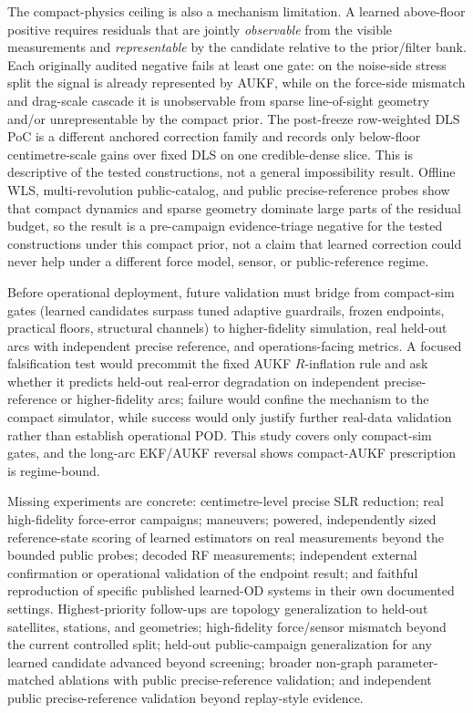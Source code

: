 \documentclass{article}
\begin{document}
The compact-physics ceiling is also a mechanism limitation. A learned above-floor positive requires residuals that are jointly \emph{observable} from the visible measurements and \emph{representable} by the candidate relative to the prior/filter bank. Each originally audited negative fails at least one gate: on the noise-side stress split the signal is already represented by AUKF, while on the force-side mismatch and drag-scale cascade it is unobservable from sparse line-of-sight geometry and/or unrepresentable by the compact prior. The post-freeze row-weighted DLS PoC is a different anchored correction family and records only below-floor centimetre-scale gains over fixed DLS on one credible-dense slice. This is descriptive of the tested constructions, not a general impossibility result. Offline WLS, multi-revolution public-catalog, and public precise-reference probes show that compact dynamics and sparse geometry dominate large parts of the residual budget, so the result is a pre-campaign evidence-triage negative for the tested constructions under this compact prior, not a claim that learned correction could never help under a different force model, sensor, or public-reference regime.

Before operational deployment, future validation must bridge from compact-sim gates (learned candidates surpass tuned adaptive guardrails, frozen endpoints, practical floors, structural channels) to higher-fidelity simulation, real held-out arcs with independent precise reference, and operations-facing metrics. A focused falsification test would precommit the fixed AUKF \(R\)-inflation rule and ask whether it predicts held-out real-error degradation on independent precise-reference or higher-fidelity arcs; failure would confine the mechanism to the compact simulator, while success would only justify further real-data validation rather than establish operational POD. This study covers only compact-sim gates, and the long-arc EKF/AUKF reversal shows compact-AUKF prescription is regime-bound.

Missing experiments are concrete: centimetre-level precise SLR reduction; real high-fidelity force-error campaigns; maneuvers; powered, independently sized reference-state scoring of learned estimators on real measurements beyond the bounded public probes; decoded RF measurements; independent external confirmation or operational validation of the endpoint result; and faithful reproduction of specific published learned-OD systems in their own documented settings. Highest-priority follow-ups are topology generalization to held-out satellites, stations, and geometries; high-fidelity force/sensor mismatch beyond the current controlled split; held-out public-campaign generalization for any learned candidate advanced beyond screening; broader non-graph parameter-matched ablations with public precise-reference validation; and independent public precise-reference validation beyond replay-style evidence.
\end{document}
